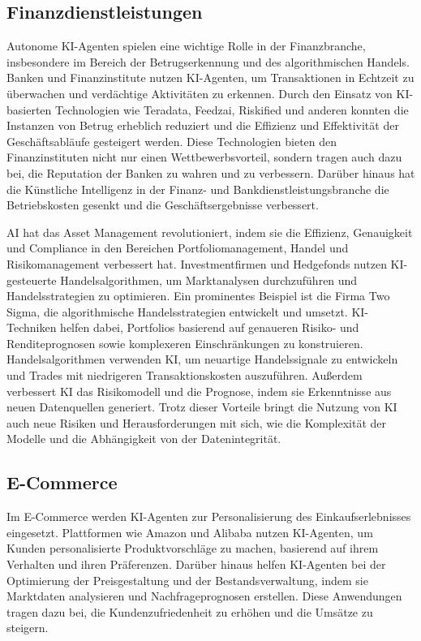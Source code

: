 \documentclass[conference]{IEEEtran}
\begin{document}
\subsection{Finanzdienstleistungen}

Autonome KI-Agenten spielen eine wichtige Rolle in der Finanzbranche, insbesondere im Bereich der Betrugserkennung und des algorithmischen Handels. Banken und Finanzinstitute nutzen KI-Agenten, um Transaktionen in Echtzeit zu überwachen und verdächtige Aktivitäten zu erkennen\cite{mohanty_role_2023}. Durch den Einsatz von KI-basierten Technologien wie Teradata, Feedzai, Riskified und anderen konnten die Instanzen von Betrug erheblich reduziert und die Effizienz und Effektivität der Geschäftsabläufe gesteigert werden. Diese Technologien bieten den Finanzinstituten nicht nur einen Wettbewerbsvorteil, sondern tragen auch dazu bei, die Reputation der Banken zu wahren und zu verbessern. Darüber hinaus hat die Künstliche Intelligenz in der Finanz- und Bankdienstleistungsbranche die Betriebskosten gesenkt und die Geschäftsergebnisse verbessert.

AI hat das Asset Management revolutioniert, indem sie die Effizienz, Genauigkeit und Compliance in den Bereichen Portfoliomanagement, Handel und Risikomanagement verbessert hat\cite{bartram_artificial_2020}. Investmentfirmen und Hedgefonds nutzen KI-gesteuerte Handelsalgorithmen, um Marktanalysen durchzuführen und Handelsstrategien zu optimieren. Ein prominentes Beispiel ist die Firma Two Sigma, die algorithmische Handelsstrategien entwickelt und umsetzt. KI-Techniken helfen dabei, Portfolios basierend auf genaueren Risiko- und Renditeprognosen sowie komplexeren Einschränkungen zu konstruieren. Handelsalgorithmen verwenden KI, um neuartige Handelssignale zu entwickeln und Trades mit niedrigeren Transaktionskosten auszuführen. Außerdem verbessert KI das Risikomodell und die Prognose, indem sie Erkenntnisse aus neuen Datenquellen generiert. Trotz dieser Vorteile bringt die Nutzung von KI auch neue Risiken und Herausforderungen mit sich, wie die Komplexität der Modelle und die Abhängigkeit von der Datenintegrität.

\subsection{E-Commerce}

Im E-Commerce werden KI-Agenten zur Personalisierung des Einkaufserlebnisses eingesetzt. Plattformen wie Amazon und Alibaba nutzen KI-Agenten, um Kunden personalisierte Produktvorschläge zu machen, basierend auf ihrem Verhalten und ihren Präferenzen\cite{behera_personalized_2020}. Darüber hinaus helfen KI-Agenten bei der Optimierung der Preisgestaltung und der Bestandsverwaltung, indem sie Marktdaten analysieren und Nachfrageprognosen erstellen. Diese Anwendungen tragen dazu bei, die Kundenzufriedenheit zu erhöhen und die Umsätze zu steigern\cite{joshi_artificial_2024}.
\end{document}

